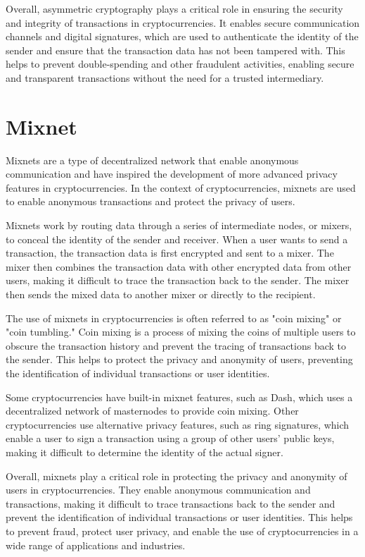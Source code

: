 \documentclass[a4paper, 10pt]{article}
\begin{document}
Overall, asymmetric cryptography plays a critical role in ensuring the security and integrity of transactions in cryptocurrencies. It enables secure communication channels and digital signatures, which are used to authenticate the identity of the sender and ensure that the transaction data has not been tampered with. This helps to prevent double-spending and other fraudulent activities, enabling secure and transparent transactions without the need for a trusted intermediary.

\section{Mixnet}\label{Mixnets}

Mixnets are a type of decentralized network that enable anonymous communication and have inspired the development of more advanced privacy features in cryptocurrencies. In the context of cryptocurrencies, mixnets are used to enable anonymous transactions and protect the privacy of users.

Mixnets work by routing data through a series of intermediate nodes, or mixers, to conceal the identity of the sender and receiver. When a user wants to send a transaction, the transaction data is first encrypted and sent to a mixer. The mixer then combines the transaction data with other encrypted data from other users, making it difficult to trace the transaction back to the sender. The mixer then sends the mixed data to another mixer or directly to the recipient.

The use of mixnets in cryptocurrencies is often referred to as "coin mixing" or "coin tumbling." Coin mixing is a process of mixing the coins of multiple users to obscure the transaction history and prevent the tracing of transactions back to the sender. This helps to protect the privacy and anonymity of users, preventing the identification of individual transactions or user identities.

Some cryptocurrencies have built-in mixnet features, such as Dash, which uses a decentralized network of masternodes to provide coin mixing. Other cryptocurrencies use alternative privacy features, such as ring signatures, which enable a user to sign a transaction using a group of other users' public keys, making it difficult to determine the identity of the actual signer.

Overall, mixnets play a critical role in protecting the privacy and anonymity of users in cryptocurrencies. They enable anonymous communication and transactions, making it difficult to trace transactions back to the sender and prevent the identification of individual transactions or user identities. This helps to prevent fraud, protect user privacy, and enable the use of cryptocurrencies in a wide range of applications and industries.
\end{document}
